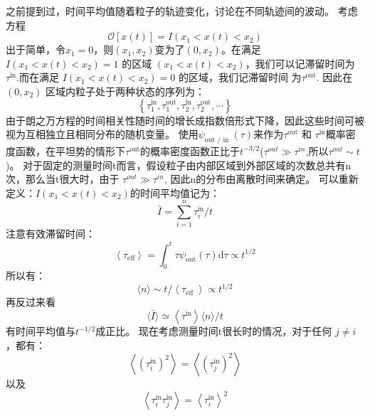 之前提到过，时间平均值随着粒子的轨迹变化，讨论在不同轨迹间的波动。
考虑方程
\begin{equation}
\mathcal{O}[x(t)]=I\left(x_{1}<x(t)<x_{2}\right)
\end{equation}
出于简单，令$x_{1}=0$，则$\left(x_{1}, x_{2}\right)$变为了$\left(0, x_{2}\right)$。在满足  $
I\left(x_{1}<x(t)<x_{2}\right)=1
$  的区域  $\left(x_{1}<x(t)<x_{2}\right)$，我们可以记滞留时间为  $\tau^ {\mathrm{in}}$.而在满足  $I\left(x_ {1}<x(t)<x_{2}\right)=0$  的区域，我们记滞留时间  为$\tau^{\mathrm{out}}$.
因此在
$\left(0, x_{2}\right)$
区域内粒子处于两种状态的序列为：
\begin{equation}
\left\{\tau_{1}^{\mathrm{in}}, \tau_{1}^{\mathrm{out}}, \tau_{2}^{\mathrm{in}}, \tau_{2}^{\mathrm{out}}, \cdots\right\}
\end{equation}
由于朗之万方程的时间相关性随时间的增长成指数倍形式下降，因此这些时间可被视为互相独立且相同分布的随机变量。
使用$\psi_{\text {out } / \text { in }}(\tau)$来作为$\tau^{\mathrm{out}}$ 和  $\tau^ {\mathrm{in}}$概率密度函数，在平坦势的情形下$\tau^{\mathrm{out}} $的概率密度函数正比于$t^{-3/2}$($\tau^{out}\gg\tau^{in}$,所以$\tau^{out}\sim t$)。
对于固定的测量时间t而言，假设粒子由内部区域到外部区域的次数总共有n 次，那么当t很大时，由于  $\tau^{out}\gg\tau^{in}$,
因此n的分布由离散时间来确定。
可以重新定义：$I\left(x_{1}<x(t)<x_{2}\right)$的时间平均值记为：
\begin{equation}
\bar{I}=\sum_{i=1}^{n} \tau_{i}^{\mathrm{in}} / t
\end{equation}
注意有效滞留时间：
\begin{equation}
\left\langle\tau_{\mathrm{eff}}\right\rangle=\int_{0}^{t} \tau \psi_{\mathrm{out}}(\tau) \mathrm{d} \tau \propto t^{1 / 2}
\end{equation}
所以有：
\begin{equation}\langle n\rangle \sim t /\left\langle\tau_{\text {eff }}\right\rangle \propto t^{1 / 2}
\end{equation}
再反过来看
\begin{equation}
\langle\bar{I}\rangle \simeq\left\langle\tau^{\mathrm{in}}\right\rangle\langle n\rangle / t
\end{equation}
有时间平均值与$t^{-1/2}$成正比。
现在考虑测量时间t很长时的情况，对于任何 $j≠i$，都有：
\begin{equation}
\left\langle\left(\tau_{i}^{\mathrm{in}}\right)^{2}\right\rangle=\left\langle\left(\tau_{j}^{\mathrm{in}}\right)^{2}\right\rangle
\end{equation}
以及
\begin{equation}
\left\langle\tau_{i}^{\mathrm{in}} \tau_{j}^{\mathrm{in}}\right\rangle=\left\langle\tau_{i}^{\mathrm{in}}\right\rangle^{2}
\end{equation}
